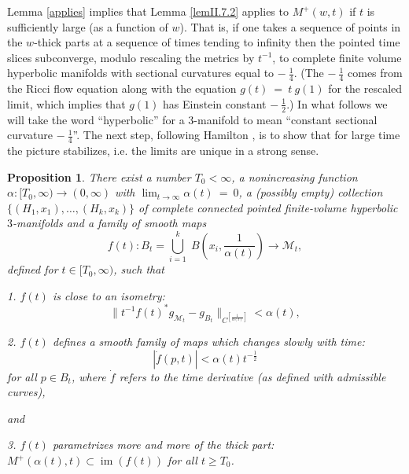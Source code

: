 \documentclass[12pt]{amsart}
\newcommand{\im}{\operatorname{im}}
\newcommand{\lra}{\longrightarrow}
\newcommand{\M}{{\mathcal M}}
\newcommand{\ra}{\rightarrow}
\numberwithin{equation}{section}
\theoremstyle{plain}
\newtheorem{proposition}[equation]{Proposition}
\theoremstyle{definition}
\theoremstyle{remark}
\begin{document}
Lemma \ref{applies} implies that Lemma \ref{lemII.7.2} applies to
$M^+(w,t)$ if $t$ is sufficiently large (as a function of $w$).
That is, if one takes a sequence of points
in the $w$-thick parts at a sequence of times tending 
to infinity then the pointed time slices subconverge,
modulo rescaling the metrics by $t^{-1}$, to complete finite volume
hyperbolic manifolds with sectional curvatures equal to
$- \: \frac14$. (The $- \: \frac14$ comes from the Ricci flow
equation along with the equation $g(t) \: = \: t \: g(1)$ for the rescaled
limit, which implies that $g(1)$ has Einstein constant $- \: \frac12$.) 
In what follows we will take the word ``hyperbolic'' for a $3$-manifold
to mean ``constant sectional curvature $- \: \frac14$''.
The next step, following Hamilton \cite{Hamiltonn},
is to show that
for large time the picture stabilizes, i.e. the limits
are unique in a strong sense. 
\begin{proposition}
\label{slowisotopy}
There exist a number $T_0<\infty$, a nonincreasing function 
$\alpha:[T_0,\infty)\ra (0,\infty)$ with
$\lim_{t \rightarrow \infty} \alpha(t) \: = \: 0$, 
a (possibly empty) collection 
$\{(H_1,x_1),\ldots,(H_k,x_k)\}$
of complete connected pointed finite-volume hyperbolic $3$-manifolds
and a family of smooth maps 
\begin{equation}
f(t):B_t= \bigcup_{i=1}^k \;B \left( x_i, \frac{1}{\alpha(t)} \right)\lra \M_t,
\end{equation}
 defined for $t\in [T_0,\infty)$, such that

1.  $f(t)$ is close to an isometry:
\begin{equation}
\|t^{-1}f(t)^*g_{\M_t}-g_{B_t}\|_{C^{[\frac{1}{\alpha(t)}]}}<\alpha(t),
\end{equation}

2. $f(t)$ defines a smooth family of maps which changes slowly
with time:
\begin{equation}
|\dot{f}(p,t)|<\alpha(t)t^{-\frac12} 
\end{equation}
for all $p\in B_t$, 
where $\dot{f}$ refers to the time derivative (as defined
with admissible curves),

and

3. $f(t)$ parametrizes more and more of the thick part:
 $M^+(\alpha(t),t)\subset \im(f(t))$ for all $t\geq T_0$. 
\end{proposition}
\end{document}
